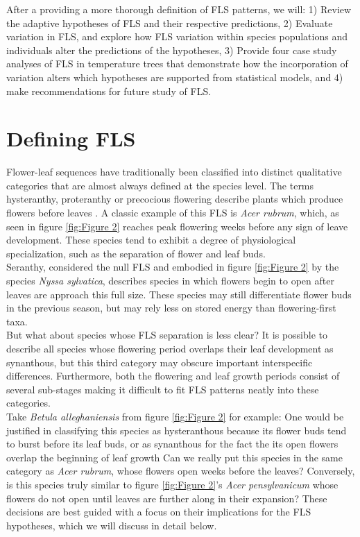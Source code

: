 \documentclass[12pt]{article}\usepackage[]{graphicx}\usepackage[]{color}
\begin{document}
\indent After a providing a more thorough definition of FLS patterns, we will: 1) Review the adaptive hypotheses of FLS and their respective predictions, 2) Evaluate variation in FLS, and explore how FLS variation within species populations and individuals alter the predictions of the hypotheses, 3) Provide four case study analyses of FLS in temperature trees that demonstrate how the incorporation of variation alters which hypotheses are supported from statistical models, and 4) make recommendations for future study of FLS. 
\section*{Defining FLS}
\indent\indent Flower-leaf sequences have traditionally been classified into distinct qualitative categories that are almost always defined at the species level. The terms hysteranthy, proteranthy or precocious flowering describe plants which produce flowers before leaves \citep{}. A classic example of this FLS is \textit{Acer rubrum}, which, as seen in figure \ref{fig:Figure 2} reaches peak flowering weeks before any sign of leave development. These species tend to exhibit a degree of physiological specialization, such as the separation of flower and leaf buds. \\
\indent Seranthy, considered the null FLS %
and embodied in figure \ref{fig:Figure 2} by the species \textit{Nyssa sylvatica}, describes species in which flowers begin to open after leaves are approach this full size. These species may still differentiate flower buds in the previous season, but may rely less on stored energy than flowering-first taxa.\\
\indent But what about species whose FLS separation is less clear? It is possible to describe all species whose flowering period overlaps their leaf development as synanthous, but this third category may obscure important interspecific differences. Furthermore, both the flowering and leaf growth periods consist of several sub-stages making it difficult to fit FLS patterns neatly into these categories.\\
 \indent Take \textit{Betula alleghaniensis} from figure \ref{fig:Figure 2} for example: One would be justified in classifying this species as hysteranthous because its flower buds tend to burst before its leaf buds, or as synanthous for the fact the its open flowers overlap the beginning of leaf growth Can we really put this species in the same category as \textit{Acer rubrum}, whose flowers open weeks before the leaves? Conversely, is this species truly similar to figure \ref{fig:Figure 2}'s \textit{Acer pensylvanicum} whose flowers do not open until leaves are further along in their expansion?  These decisions are best guided with a focus on their implications for the FLS hypotheses, which we will discuss in detail below. 
\end{document}
